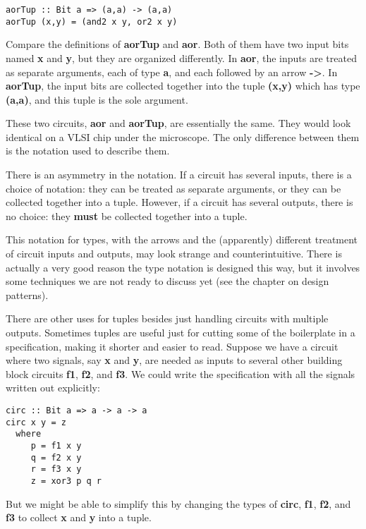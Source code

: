 \documentclass[11pt]{article}
\begin{document}
\begin{verbatim}
aorTup :: Bit a => (a,a) -> (a,a)
aorTup (x,y) = (and2 x y, or2 x y)
\end{verbatim}


Compare the definitions of \textbf{aorTup} and \textbf{aor}.  Both of them have two
input bits named \textbf{x} and \textbf{y}, but they are organized differently.  In
\textbf{aor}, the inputs are treated as separate arguments, each of type \textbf{a},
and each followed by an arrow \textbf{->}.  In \textbf{aorTup}, the input bits are
collected together into the tuple \textbf{(x,y)} which has type \textbf{(a,a)}, and
this tuple is the sole argument.

These two circuits, \textbf{aor} and \textbf{aorTup}, are essentially the same.
They would look identical on a VLSI chip under the microscope.  The
only difference between them is the notation used to describe them.

There is an asymmetry in the notation.  If a circuit has several
inputs, there is a choice of notation: they can be treated as separate
arguments, or they can be collected together into a tuple.  However,
if a circuit has several outputs, there is no choice: they \textbf{must}
be collected together into a tuple.

This notation for types, with the arrows and the (apparently)
different treatment of circuit inputs and outputs, may look strange
and counterintuitive.  There is actually a very good reason the type
notation is designed this way, but it involves some techniques we are
not ready to discuss yet (see the chapter on design patterns).

There are other uses for tuples besides just handling circuits with
multiple outputs.  Sometimes tuples are useful just for cutting some
of the boilerplate in a specification, making it shorter and easier to
read.  Suppose we have a circuit where two signals, say \textbf{x} and \textbf{y},
are needed as inputs to several other building block circuits \textbf{f1},
\textbf{f2}, and \textbf{f3}.  We could write the specification with all the signals
written out explicitly:

\begin{verbatim}
circ :: Bit a => a -> a -> a
circ x y = z
  where
     p = f1 x y
     q = f2 x y
     r = f3 x y
     z = xor3 p q r
\end{verbatim}

But we might be able to simplify this by changing the types of \textbf{circ},
\textbf{f1}, \textbf{f2}, and \textbf{f3} to collect \textbf{x} and \textbf{y} into a tuple.
\end{document}
